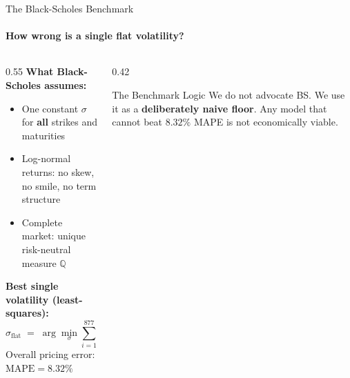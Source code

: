 \documentclass[aspectratio=169]{beamer}
\newcommand{\Qmeas}{\mathbb{Q}}
\begin{document}

\begin{frame}{The Black-Scholes Benchmark}
\framesubtitle{How wrong is a single flat volatility?}

\begin{columns}[T]
\begin{column}{0.55\textwidth}
\textbf{What Black-Scholes assumes:}
\begin{itemize}
    \item One constant $\sigma$ for \textbf{all} strikes and maturities
    \item Log-normal returns: no skew, no smile, no term structure
    \item Complete market: unique risk-neutral measure $\Qmeas$
\end{itemize}
\vspace{0.3cm}
\textbf{Best single volatility (least-squares):}
\begin{equation}
\hat\sigma_{\text{flat}} \;=\; \arg\min_{\sigma} \sum_{i=1}^{877} \bigl( C_{\text{BS}}^{(i)}(\sigma) - C_{\text{mid}}^{(i)} \bigr)^2
\;=\; \boxed{16.20\%}
\end{equation}
\vspace{0.2cm}
Overall pricing error: $\text{MAPE} = 8.32\%$
\end{column}

\begin{column}{0.42\textwidth}
\begin{block}{The Benchmark Logic}
We do not advocate BS. We use it as a \textbf{deliberately naive floor}. Any model that cannot beat $8.32\%$ MAPE is not economically viable.
\end{block}
\end{column}
\end{columns}

\end{frame}

\end{document}

